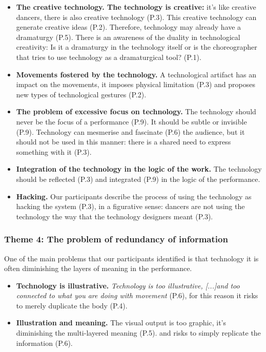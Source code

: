 \begin{itemize}
\item \textbf{The creative technology. The technology is creative: }it’s like creative dancers, there is also creative technology (P.3). This creative technology can generate creative ideas (P.2). Therefore, technology may already have a dramaturgy (P.5). There is an awareness of the duality in technological creativity: Is it a dramaturgy in the technology itself or is the choreographer that tries to use technology as a dramaturgical tool? (P.1).
\item \textbf{Movements fostered by the technology. }A technological artifact has an impact on the movements, it imposes physical limitation (P.3) and proposes new types of technological gestures (P.2).
\item \textbf{The problem of excessive focus on technology. }The technology should never be the focus of a performance (P.9). It should be subtle or invisible (P.9). Technology can mesmerise and fascinate (P.6) the audience, but it should not be used in this manner: there is a shared need to express something with it (P.3).
\item \textbf{Integration of the technology in the logic of the work.} The technology should be reflected (P.3) and integrated (P.9) in the logic of the performance.
\item \textbf{Hacking. } Our participants describe the process of using the technology as hacking the system (P.3), in a figurative sense: dancers are not using the technology the way that the technology designers meant (P.3).
\end{itemize}

\subsubsection{Theme 4: The problem of redundancy of information}

One of the main problems that our participants identified is that technology it is often diminishing the layers of meaning in the performance.

\begin{itemize}
\item \textbf{Technology is illustrative.} \textit{Technology is too illustrative, [...]and too connected to what you are doing with movement} (P.6), for this reason it risks to merely duplicate the body (P.4).
\item \textbf{Illustration and meaning.} The visual output is too graphic, it’s diminishing the multi-layered meaning (P.5). and risks to simply replicate the information (P.6).
\end{itemize}

